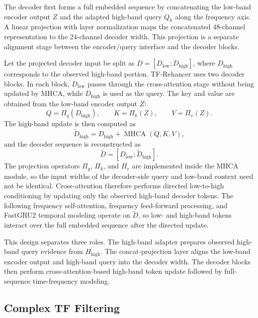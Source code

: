 The decoder first forms a full embedded sequence by concatenating the low-band encoder output \(Z\) and the adapted high-band query \(Q_h\) along the frequency axis. A linear projection with layer normalization maps the concatenated 48-channel representation to the 24-channel decoder width. This projection is a separate alignment stage between the encoder/query interface and the decoder blocks.

Let the projected decoder input be split as \(D=[D_{\mathrm{low}};D_{\mathrm{high}}]\), where \(D_{\mathrm{high}}\) corresponds to the observed high-band portion. TF-Rehancer uses two decoder blocks. In each block, \(D_{\mathrm{low}}\) passes through the cross-attention stage without being updated by MHCA, while \(D_{\mathrm{high}}\) is used as the query. The key and value are obtained from the low-band encoder output \(Z\):
\begin{equation}
    Q = \Pi_q(D_{\mathrm{high}}), \qquad
    K = \Pi_k(Z), \qquad
    V = \Pi_v(Z).
\end{equation}
The high-band update is then computed as
\begin{equation}
    \tilde{D}_{\mathrm{high}}
    =
    D_{\mathrm{high}}
    +
    \operatorname{MHCA}(Q,K,V),
\end{equation}
and the decoder sequence is reconstructed as
\begin{equation}
    \tilde{D}=[D_{\mathrm{low}};\tilde{D}_{\mathrm{high}}].
\end{equation}
The projection operators \(\Pi_q\), \(\Pi_k\), and \(\Pi_v\) are implemented inside the MHCA module, so the input widths of the decoder-side query and low-band context need not be identical. Cross-attention therefore performs directed low-to-high conditioning by updating only the observed high-band decoder tokens. The following frequency self-attention, frequency feed-forward processing, and FastGRU2 temporal modeling operate on \(\tilde{D}\), so low- and high-band tokens interact over the full embedded sequence after the directed update.

This design separates three roles. The high-band adapter prepares observed high-band query evidence from \(H_{\mathrm{high}}\). The concat-projection layer aligns the low-band encoder output and high-band query into the decoder width. The decoder blocks then perform cross-attention-based high-band token update followed by full-sequence time-frequency modeling.

\subsection{Complex TF Filtering}
\label{sec:method_filtering}

